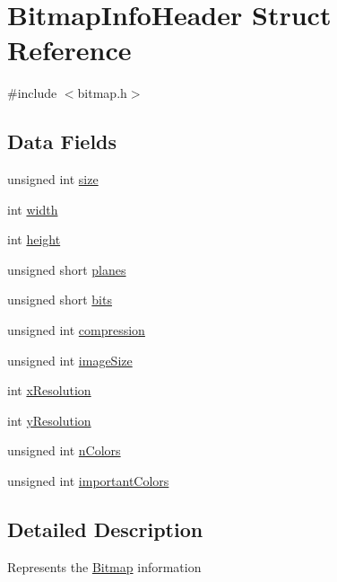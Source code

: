 \hypertarget{struct_bitmap_info_header}{}\section{Bitmap\+Info\+Header Struct Reference}
\label{struct_bitmap_info_header}


{\ttfamily \#include $<$bitmap.\+h$>$}

\subsection*{Data Fields}
\begin{DoxyCompactItemize}
\item 
unsigned int \hyperlink{struct_bitmap_info_header_aac913b3a1f6ef005d66bf7a84428773e}{size}
\item 
int \hyperlink{struct_bitmap_info_header_a2474a5474cbff19523a51eb1de01cda4}{width}
\item 
int \hyperlink{struct_bitmap_info_header_ad12fc34ce789bce6c8a05d8a17138534}{height}
\item 
unsigned short \hyperlink{struct_bitmap_info_header_a8c89d091e05544a82dc2398eed99634f}{planes}
\item 
unsigned short \hyperlink{struct_bitmap_info_header_a47d1d4d776f8fd3bb0f7dbc3c5aeb534}{bits}
\item 
unsigned int \hyperlink{struct_bitmap_info_header_ad180079f62b44e49ec672c9ef6e078b3}{compression}
\item 
unsigned int \hyperlink{struct_bitmap_info_header_adcd57a0168319e747bc8099218d3822c}{image\+Size}
\item 
int \hyperlink{struct_bitmap_info_header_ac6eaeb4c0876cf6cd899f41fe3c25ff5}{x\+Resolution}
\item 
int \hyperlink{struct_bitmap_info_header_aa2f350dd0bda750656d5db5f5e37b2b3}{y\+Resolution}
\item 
unsigned int \hyperlink{struct_bitmap_info_header_aed4506bad904845183194f199f1bdb98}{n\+Colors}
\item 
unsigned int \hyperlink{struct_bitmap_info_header_a8f7abfbc446b12f385d2b42c3b4fd9b0}{important\+Colors}
\end{DoxyCompactItemize}


\subsection{Detailed Description}
Represents the \hyperlink{struct_bitmap}{Bitmap} information 

